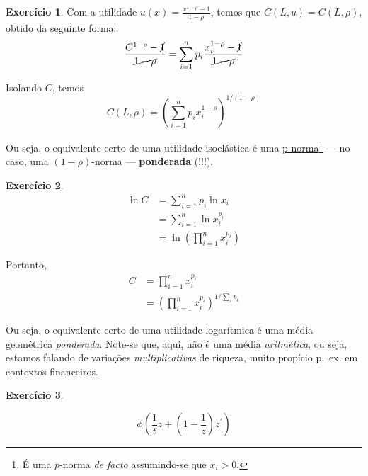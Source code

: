 \documentclass[12pt]{article}
\numberwithin{equation}{section}
\theoremstyle{plain}
\theoremstyle{definition}
\newtheorem{exercise}{Exercício}[section]
\theoremstyle{remark}
\begin{document}
\begin{exercise}
Com a utilidade \(u(x) = \frac{x^{1-\rho}-1}{1-\rho}\), temos que
\(C(L, u) = C(L, \rho)\), obtido da seguinte forma:
\[
\begin{align*}
\frac{C^{1-\rho}-\cancel{ 1 }}{\cancel{ 1-\rho }} &= \sum \limits_{i=1}^{n} p_{i} \frac{x_{i}^{1-\rho}-\cancel{ 1 }}{\cancel{ 1-\rho }} \\
\end{align*}
\]

Isolando \(C\), temos
\[
C(L, \rho) = \left( \sum \limits_{i=1}^{n} p_{i} x_{i}^{1-\rho} \right)^{1/(1-\rho)}
\]

Ou seja, o equivalente certo de uma utilidade isoelástica é uma
\href{https://en.wikipedia.org/wiki/Norm_(mathematics)\#p-norm}{p-norma}\footnote{É
  uma \(p\)-norma \textit{de facto} assumindo-se que \(x_{i}>0\).} ---
no caso, uma \((1-\rho)\)-norma --- \textbf{ponderada} (!!!).
\end{exercise}

\begin{exercise}

\[
\begin{align*}
\ln C &= \sum \limits_{i=1}^{n} p_{i} \ln x_{i} \\
&= \sum \limits_{i=1}^{n} \ln x_{i}^{p_{i}} \\
&= \ln \left( \prod \limits_{i=1}^{n} x_{i}^{p_{i}} \right)
\end{align*}
\]

Portanto,
\[
\begin{align*}
C &= \prod \limits_{i=1}^{n} x_{i}^{p_{i}} \\
&= \left( \prod \limits_{i=1}^{n} x_{i}^{p_{i}} \right)^{1/\sum \limits_{i}p_{i}}
\end{align*}
\]

Ou seja, o equivalente certo de uma utilidade logarítmica é uma média
geométrica \textit{ponderada}. Note-se que, aqui, não é uma média
\textit{aritmética}, ou seja, estamos falando de variações
\textit{multiplicativas} de riqueza, muito propício p.~ex. em contextos
financeiros.
\end{exercise}

\begin{exercise}

\end{exercise}

\[
\phi\left( \frac{1}{t}z + \left( 1-\frac{1}{z} \right)z^{\prime} \right) 
\]

\printbibliography
\end{document}
